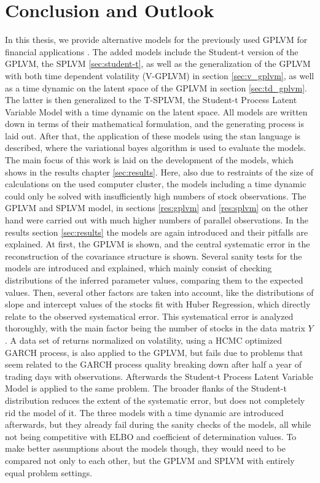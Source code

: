 \chapter{Conclusion and Outlook}
In this thesis, we provide alternative models for the previously used GPLVM for financial applications \cite{Nirwan_2019}. The added models include the Student-t version of the GPLVM, the SPLVM \ref{sec:student-t}, as well as the generalization of the GPLVM with both time dependent volatility (V-GPLVM) in section \ref{sec:v_gplvm}, as well as a time dynamic on the latent space of the GPLVM in section \ref{sec:td_gplvm}. The latter is then generalized to the T-SPLVM, the Student-t Process Latent Variable Model with a time dynamic on the latent space. All models are written down in terms of their mathematical formulation, and the generating process is laid out. After that, the application of these models using the stan \cite{stan_overview} language is described, where the variational bayes algorithm is used to evaluate the models. The main focus of this work is laid on the development of the models, which shows in the results chapter \ref{sec:results}. Here, also due to restraints of the size of calculations on the used computer cluster, the models including a time dynamic could only be solved with insufficiently high numbers of stock observations. The GPLVM and SPLVM model, in sections \ref{res:gplvm} and \ref{res:splvm} on the other hand were carried out with much higher numbers of parallel observations. \newline \newline
In the results section \ref{sec:results} the models are again introduced and their pitfalls are explained. At first, the GPLVM is shown, and the central systematic error in the reconstruction of the covariance structure is shown. Several sanity tests for the models are introduced and explained, which mainly consist of checking distributions of the inferred parameter values, comparing them to the expected values. Then, several other factors are taken into account, like the distributions of slope and intercept values of the stocks fit with Huber Regression, which directly relate to the observed systematical error. This systematical error is analyzed thoroughly, with the main factor being the number of stocks in the data matrix $Y$. A data set of returns normalized on volatility, using a HCMC optimized GARCH process, is also applied to the GPLVM, but fails due to problems that seem related to the GARCH process quality breaking down after half a year of trading days with observations. Afterwards the Student-t Process Latent Variable Model is applied to the same problem. The broader flanks of the Student-t distribution reduces the extent of the systematic error, but does not completely rid the model of it. The three models with a time dynamic are introduced afterwards, but they already fail during the sanity checks of the models, all while not being competitive with ELBO and coefficient of determination values. To make better assumptions about the models though, they would need to be compared not only to each other, but the GPLVM and SPLVM with entirely equal problem settings.
